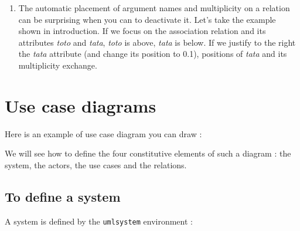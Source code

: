 \documentclass[a4paper,11pt]{report}
\newcommand{\inputTikZ}[1]{%
  }%
\newcommand{\inputTikZ}[1]{%
    \texttt{[image: fig/\#1.pdf]}%
  }%
\begin{document}
\begin{enumerate}
\medskip

The solution is to use a specific macro given by these options of babel package you have to use in the preamble of your document :

\medskip

\begin{lstlisting}
\frenchbsetup{AutoSpacePunctuation=false}
\end{lstlisting}

\medskip

\item The automatic placement of argument names and multiplicity on a relation can be surprising when you can to deactivate it. Let's take the example shown in introduction. If we focus on the association relation and its attributes {\it toto} and {\it tata}, {\it toto} is above, {\it tata} is below. 
If we justify to the right the {\it tata} attribute (and change its position to 0.1), positions of {\it tata} and its multiplicity exchange.

\begin{center}
\inputTikZ{bugalign}
\end{center}

\end{enumerate}

\chapter{Use case diagrams}\label{c.usecase}

Here is an example of use case diagram you can draw :

\begin{center}
\inputTikZ{usecaseex}
\end{center}

We will see how to define the four constitutive elements of such a diagram : the system, the actors, the use cases and the relations.

\section{To define a system}\label{s.system}

A system is defined by the {\tt umlsystem} environment :

\medskip

\begin{minipage}{0.6\textwidth}

\end{minipage}
\begin{minipage}{0.4\textwidth}
\begin{center}
\inputTikZ{system}
\end{center}
\end{minipage}
\end{document}
